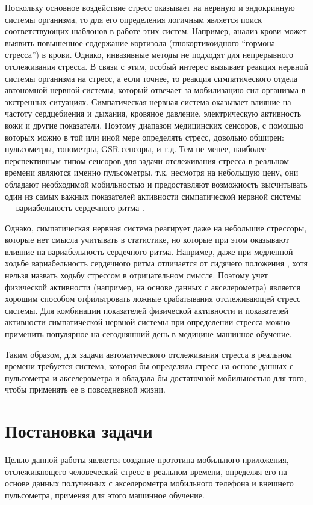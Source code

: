 \documentclass[14pt]{matmex-diploma-custom}
\begin{document}
Поскольку основное воздействие стресс оказывает на нервную и эндокринную системы
организма, то для его определения логичным является поиск соответствующих
шаблонов в работе этих систем. Например, анализ крови может выявить повышенное
содержание кортизола (глюкортикоидного ``гормона стресса'') в крови. Однако,
инвазивные методы не подходят для непрерывного отслеживания стресса. В связи с
этим, особый интерес вызывает реакция нервной системы организма на стресс, а
если точнее, то реакция симпатического отдела автономной нервной системы,
который отвечает за мобилизацию сил организма в экстренных ситуациях.
Симпатическая нервная система оказывает влияние на частоту сердцебиения и
дыхания, кровяное давление, электрическую активность кожи и другие показатели.
Поэтому диапазон медицинских сенсоров, с помощью которых можно в той или иной
мере определять стресс, довольно обширен: пульсометры, тонометры, GSR сенсоры, и
т.д. Тем не менее, наиболее перспективным типом сенсоров для задачи отслеживания
стресса в реальном времени являются именно пульсометры, т.к. несмотря на
небольшую цену, они обладают необходимой мобильностью и предоставляют
возможность высчитывать один из самых важных показателей активности
симпатической нервной системы --- вариабельность сердечного ритма
\cite{article:hrv_stress}.

Однако, симпатическая нервная система реагирует даже на небольшие стрессоры,
которые нет смысла учитывать в статистике, но которые при этом оказывают влияние
на вариабельность сердечного ритма. Например, даже при медленной ходьбе
вариабельность сердечного ритма отличается от сидячего положения
\cite{article:hrv_reliability}, хотя нельзя назвать ходьбу стрессом в
отрицательном смысле. Поэтому учет физической активности (например, на основе
данных с акселерометра) является хорошим способом отфильтровать ложные
срабатывания отслеживающей стресс системы. Для комбинации показателей физической
активности и показателей активности симпатической нервной системы при
определении стресса можно применить популярное на сегодняшний день в медицине
машинное обучение.

Таким образом, для задачи автоматического отслеживания стресса в реальном
времени требуется система, которая бы определяла стресс на основе данных с
пульсометра и акселерометра и обладала бы достаточной мобильностью для того,
чтобы применять ее в повседневной жизни.
	
\section{Постановка задачи}
Целью данной работы является создание прототипа мобильного приложения,
отслеживающего человеческий стресс в реальном времени, определяя его на основе
данных полученных с акселерометра мобильного телефона и внешнего пульсометра,
применяя для этого машинное обучение.
\end{document}
